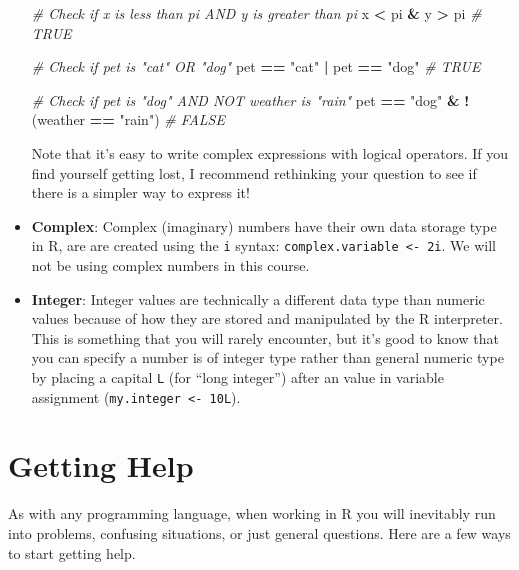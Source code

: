 \documentclass[]{book}
\newenvironment{Shaded}{\begin{snugshade}}{\end{snugshade}}
\newcommand{\StringTok}[1]{\textcolor[rgb]{0.31,0.60,0.02}{#1}}
\newcommand{\CommentTok}[1]{\textcolor[rgb]{0.56,0.35,0.01}{\textit{#1}}}
\newcommand{\OperatorTok}[1]{\textcolor[rgb]{0.81,0.36,0.00}{\textbf{#1}}}
\newcommand{\NormalTok}[1]{#1}
\theoremstyle{definition}
\theoremstyle{definition}
\theoremstyle{remark}
\begin{document}
\begin{itemize}
\begin{Shaded}
\begin{Highlighting}[]
\CommentTok{# Check if x is less than pi AND y is greater than pi}
\NormalTok{x }\OperatorTok{<}\StringTok{ }\NormalTok{pi }\OperatorTok{&}\StringTok{ }\NormalTok{y }\OperatorTok{>}\StringTok{ }\NormalTok{pi  }\CommentTok{# TRUE}

\CommentTok{# Check if pet is "cat" OR "dog"}
\NormalTok{pet }\OperatorTok{==}\StringTok{ "cat"} \OperatorTok{|}\StringTok{ }\NormalTok{pet }\OperatorTok{==}\StringTok{ "dog"}  \CommentTok{# TRUE}

\CommentTok{# Check if pet is "dog" AND NOT weather is "rain"}
\NormalTok{pet }\OperatorTok{==}\StringTok{ "dog"} \OperatorTok{&}\StringTok{ }\OperatorTok{!}\NormalTok{(weather }\OperatorTok{==}\StringTok{ "rain"}\NormalTok{)  }\CommentTok{# FALSE}
\end{Highlighting}
\end{Shaded}

  Note that it's easy to write complex expressions with logical
  operators. If you find yourself getting lost, I recommend rethinking
  your question to see if there is a simpler way to express it!
\item
  \textbf{Complex}: Complex (imaginary) numbers have their own data
  storage type in R, are are created using the \texttt{i} syntax:
  \texttt{complex.variable\ \textless{}-\ 2i}. We will not be using
  complex numbers in this course.
\item
  \textbf{Integer}: Integer values are technically a different data type
  than numeric values because of how they are stored and manipulated by
  the R interpreter. This is something that you will rarely encounter,
  but it's good to know that you can specify a number is of integer type
  rather than general numeric type by placing a capital \texttt{L} (for
  ``long integer'') after an value in variable assignment
  (\texttt{my.integer\ \textless{}-\ 10L}).
\end{itemize}

\section{Getting Help}\label{gettinghelp}

As with any programming language, when working in R you will inevitably
run into problems, confusing situations, or just general questions. Here
are a few ways to start getting help.
\end{document}
